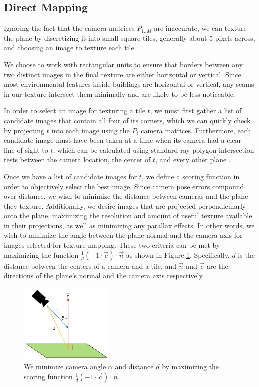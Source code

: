 \message{ !name(oldpaper.tex)}\documentclass[10pt,twocolumn,letterpaper]{article}
\begin{document}
\subsection{Direct Mapping}
\label{sec:directMapping}

Ignoring the fact that the camera matrices $P_{1..M}$ are inaccurate,
we can texture the plane by discretizing it into small square tiles,
generally about 5 pixels across, and choosing an image to texture each
tile.

We choose to work with rectangular units to ensure that borders
between any two distinct images in the final texture are either
horizontal or vertical. Since most environmental features inside
buildings are horizontal or vertical, any seams in our texture
intersect them minimally and are likely to be less noticeable.

In order to select an image for texturing a tile $t$, we must first
gather a list of candidate images that contain all four of its
corners, which we can quickly check by projecting $t$ into each image
using the $P_i$ camera matrices. Furthermore, each candidate image
must have been taken at a time when its camera had a clear
line-of-sight to $t$, which can be calculated using standard
ray-polygon intersection tests between the camera location, the center
of $t$, and every other plane \cite{rayintersection}.

Once we have a list of candidate images for $t$, we define a scoring
function in order to objectively select the best image. Since camera
pose errors compound over distance, we wish to minimize the distance
between cameras and the plane they texture. Additionally, we desire
images that are projected perpendicularly onto the plane, maximizing
the resolution and amount of useful texture available in their
projections, as well as minimizing any parallax effects. In other
words, we wish to minimize the angle between the plane normal and the
camera axis for images selected for texture mapping. These two
criteria can be met by maximizing the function $\frac{1}{d} (-1 \cdot
\vec{c}) \cdot \vec{n}$ as shown in Figure
\ref{fig:scoringFunction}. Specifically, $d$ is the distance between
the centers of a camera and a tile, and $\vec{n}$ and $\vec{c}$ are
the directions of the plane's normal and the camera axis respectively.

\begin{figure}
  \centering
  \includegraphics[height=1.5in]{scoringFunction.jpg}
  \caption{We minimize camera angle $\alpha$ and distance $d$ by
    maximizing the scoring function $\frac{1}{d} (-1 \cdot \vec{c})
    \cdot \vec{n}$}
  \label{fig:scoringFunction}
\end{figure}
\end{document}

